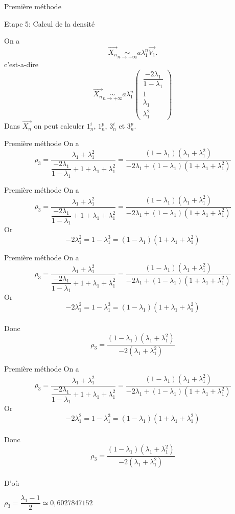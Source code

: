 \documentclass[12pt]{beamer}
\begin{document}
\begin{frame}[t]{Première méthode}
  \begin{block}{Etape 5: Calcul de la densité}
  \end{block}
On a $$\overrightarrow{X_n}\underset{n\rightarrow + \infty}{\sim}a\lambda_1^n\overrightarrow{V_1}.$$
c'est-a-dire $$\overrightarrow{X_n}\underset{n\rightarrow + \infty}{\sim}a\lambda_1^n\left(
\begin{array}{c}
\dfrac{-2\lambda_1}{1-\lambda_1} \\ 
1 \\ 
 \lambda_1\\ 
\lambda_1^2
\end{array} \right)$$ 
Dans $\overrightarrow{X_n}$ on peut calculer $1_n^i$, $1_n^p$, $3_n^i$ et $3_n^p$.
\end{frame}
\begin{frame}[t]{Première méthode}
On a
$$\rho_3=\dfrac{\lambda_1+\lambda_1^2}{\dfrac{-2\lambda_1}{1-\lambda_1}+1+\lambda_1+\lambda_1^2}=\dfrac{(1-\lambda_1)(\lambda_1+\lambda_1^2)}{-2\lambda_1+(1-\lambda_1)(1+\lambda_1+\lambda_1^2)}$$
\end{frame}
\begin{frame}[t]{Première méthode}
On a
$$\rho_3=\dfrac{\lambda_1+\lambda_1^2}{\dfrac{-2\lambda_1}{1-\lambda_1}+1+\lambda_1+\lambda_1^2}=\dfrac{(1-\lambda_1)(\lambda_1+\lambda_1^2)}{-2\lambda_1+(1-\lambda_1)(1+\lambda_1+\lambda_1^2)}$$ 
Or $$-2\lambda_1^2=1-\lambda_1^3=(1-\lambda_1)(1+\lambda_1+\lambda_1^2) $$
\end{frame}
\begin{frame}[t]{Première méthode}
On a
$$\rho_3=\dfrac{\lambda_1+\lambda_1^2}{\dfrac{-2\lambda_1}{1-\lambda_1}+1+\lambda_1+\lambda_1^2}=\dfrac{(1-\lambda_1)(\lambda_1+\lambda_1^2)}{-2\lambda_1+(1-\lambda_1)(1+\lambda_1+\lambda_1^2)}$$ 
Or $$-2\lambda_1^2=1-\lambda_1^3=(1-\lambda_1)(1+\lambda_1+\lambda_1^2) $$ \\
 Donc $$\rho_3=\dfrac{(1-\lambda_1)(\lambda_1+\lambda_1^2)}{-2(\lambda_1+\lambda_1^2)}$$
\end{frame}
\begin{frame}[t]{Première méthode}
On a
$$\rho_3=\dfrac{\lambda_1+\lambda_1^2}{\dfrac{-2\lambda_1}{1-\lambda_1}+1+\lambda_1+\lambda_1^2}=\dfrac{(1-\lambda_1)(\lambda_1+\lambda_1^2)}{-2\lambda_1+(1-\lambda_1)(1+\lambda_1+\lambda_1^2)}$$ 
Or $$-2\lambda_1^2=1-\lambda_1^3=(1-\lambda_1)(1+\lambda_1+\lambda_1^2) $$ \\
 Donc $$\rho_3=\dfrac{(1-\lambda_1)(\lambda_1+\lambda_1^2)}{-2(\lambda_1+\lambda_1^2)}$$ \\
 D'où\begin{center}
  $\rho_3=\dfrac{\lambda_1-1}{2}\simeq0,6027847152$
 \end{center}
\end{frame}
\end{document}
